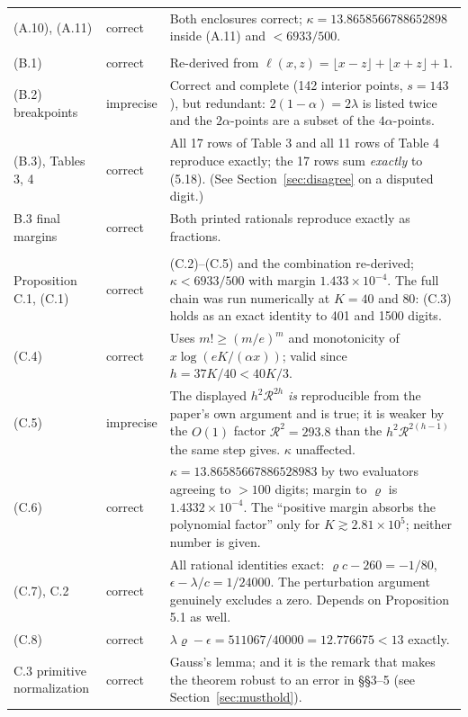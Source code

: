 \documentclass[11pt]{article}
\theoremstyle{definition}
\newcommand{\OK}{correct}
\newcommand{\IM}{imprecise}
\begin{document}
\begin{longtable}{@{}p{2.55cm}p{1.75cm}p{9.5cm}@{}}
(A.10), (A.11) & \OK & Both enclosures correct; $\kappa=13.8658566788652898$ inside (A.11) and $<6933/500$. \\
\addlinespace
\multicolumn{3}{@{}l}{\textbf{Appendix B}}\\
(B.1) & \OK & Re-derived from $\ell(x,z)=\lfloor x-z\rfloor+\lfloor x+z\rfloor+1$. \\
(B.2) breakpoints & \IM & Correct and complete (142 interior points, $s=143$), but redundant: $2(1-\alpha)=2\lambda$ is listed twice and the $2\alpha$-points are a subset of the $4\alpha$-points. \\
(B.3), Tables 3, 4 & \OK & All 17 rows of Table 3 and all 11 rows of Table 4 reproduce exactly; the 17 rows sum \emph{exactly} to (5.18). (See Section~\ref{sec:disagree} on a disputed digit.) \\
B.3 final margins & \OK & Both printed rationals reproduce exactly as fractions. \\
\addlinespace
\multicolumn{3}{@{}l}{\textbf{Appendix C}}\\
Proposition C.1, (C.1) & \OK & (C.2)--(C.5) and the combination re-derived; $\kappa<6933/500$ with margin $1.433\times10^{-4}$. The full chain was run numerically at $K=40$ and $80$: (C.3) holds as an exact identity to 401 and 1500 digits. \\
(C.4) & \OK & Uses $m!\ge(m/e)^m$ and monotonicity of $x\log(eK/(\alpha x))$; valid since $h=37K/40<40K/3$. \\
(C.5) & \IM & The displayed $h^2\mathcal{R}^{2h}$ \emph{is} reproducible from the paper's own argument and is true; it is weaker by the $O(1)$ factor $\mathcal{R}^2=293.8$ than the $h^2\mathcal{R}^{2(h-1)}$ the same step gives. $\kappa$ unaffected. \\
(C.6) & \OK & $\kappa=13.86585667886528983$ by two evaluators agreeing to $>100$ digits; margin to $\varrho$ is $1.4332\times10^{-4}$. The ``positive margin absorbs the polynomial factor'' only for $K\gtrsim2.81\times10^5$; neither number is given. \\
(C.7), C.2 & \OK & All rational identities exact: $\varrho c-260=-1/80$, $\epsilon-\lambda/c=1/24000$. The perturbation argument genuinely excludes a zero. Depends on Proposition 5.1 as well. \\
(C.8) & \OK & $\lambda\varrho-\epsilon=511067/40000=12.776675<13$ exactly. \\
C.3 primitive normalization & \OK & Gauss's lemma; and it is the remark that makes the theorem robust to an error in \S\S3--5 (see Section~\ref{sec:musthold}). \\
\end{longtable}
\endgroup
\end{document}
